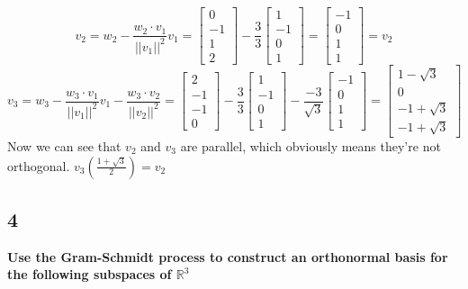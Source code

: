 \documentclass[10pt,letterpaper]{article}
\begin{document}
	$$
	v_2 = w_2 - \frac{w_2 \cdot v_1}{||v_1||^2} v_1 = \begin{bmatrix}
	0 \\ -1 \\ 1 \\ 2 
	\end{bmatrix} - \frac{3}{3} \begin{bmatrix}
	1 \\ -1 \\ 0 \\ 1
	\end{bmatrix} = \begin{bmatrix}
	-1 \\ 0 \\ 1 \\ 1
	\end{bmatrix} = v_2
	$$
	$$
	v_3 = w_3 - \frac{w_3 \cdot v_1}{||v_1||^2} v_1 - \frac{w_3 \cdot v_2}{||v_2||^2} = \begin{bmatrix}
	2 \\ -1 \\ -1 \\ 0
	\end{bmatrix} - \frac{3}{3} \begin{bmatrix}
	1 \\ -1 \\ 0 \\ 1
	\end{bmatrix} - \frac{-3}{\sqrt{3}} \begin{bmatrix}
	-1 \\ 0 \\ 1 \\ 1
	\end{bmatrix} = \begin{bmatrix}
	1 - \sqrt{3} \\ 0 \\ -1 + \sqrt{3} \\ -1 + \sqrt{3}
	\end{bmatrix}
	$$
	Now we can see that $v_2$ and $v_3$ are parallel, which obviously means they're not orthogonal. $v_3(\frac{1 + \sqrt{3}}{2}) = v_2$
	\subsection*{4}\textbf{Use the Gram-Schmidt process to construct an orthonormal basis for the following subspaces of $\mathbb{R}^3$}
\end{document}
